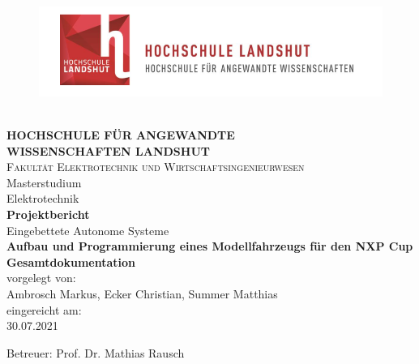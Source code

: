
\begin{titlepage}
\begin{center}

\begin{figure}[H]
\includegraphics[width=15cm]{titlepage/images/Logo_HAW_Landshut} 
\end{figure}\textnormal{ }\\[0.1cm]

\textbf{\large{HOCHSCHULE FÜR ANGEWANDTE\\[0.5cm] WISSENSCHAFTEN LANDSHUT}}\\[1.0cm]
\textsc{\large {Fakultät Elektrotechnik und Wirtschaftsingenieurwesen}}\\[1.0cm]
\textnormal{{Masterstudium}}\\[0.5cm]
\textnormal{{Elektrotechnik}}\\[1.0cm]

\Large\textbf{Projektbericht}\\[0.5cm]
\large{Eingebettete Autonome Systeme}\\[0.5cm]

\large\textbf {Aufbau und Programmierung eines Modellfahrzeugs
für den NXP Cup Gesamtdokumentation}\\[1.5cm]

\small\textnormal{vorgelegt von:}\\[0.3cm]
\textnormal{Ambrosch Markus, Ecker Christian, Summer Matthias}\\[0.3cm]
\textnormal eingereicht am:\\[0.3cm]
\textnormal{30.07.2021}

\vfill

\textnormal{Betreuer: Prof. Dr. Mathias Rausch} 

\end{center}
\end{titlepage}
\newpage